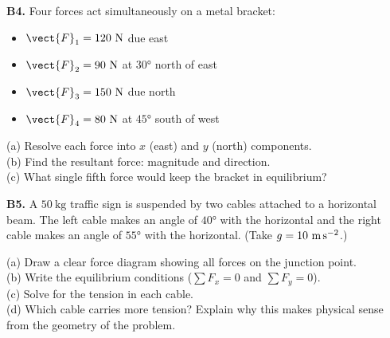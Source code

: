 \begin{exercisebox}[2]
\vspace{0.4cm}

\textbf{B4.} Four forces act simultaneously on a metal
bracket:
\begin{itemize}[noitemsep]
  \item $\vect{F}_1 = 120\ \text{N}$ due east
  \item $\vect{F}_2 = 90\ \text{N}$ at $30°$ north of east
  \item $\vect{F}_3 = 150\ \text{N}$ due north
  \item $\vect{F}_4 = 80\ \text{N}$ at $45°$ south of west
\end{itemize}
(a) Resolve each force into $x$ (east) and $y$ (north)
components.\\
(b) Find the resultant force: magnitude and direction.\\
(c) What single fifth force would keep the bracket in
equilibrium?
\hfill{}

\vspace{0.4cm}

\textbf{B5.} A $50\ \text{kg}$ traffic sign is suspended
by two cables attached to a horizontal beam. The left cable
makes an angle of $40°$ with the horizontal and the right
cable makes an angle of $55°$ with the horizontal.
(Take $g = 10\ \text{m\,s}^{-2}$.)\\[4pt]
\begin{center}
\end{center}
(a) Draw a clear force diagram showing all forces on the
junction point.\\
(b) Write the equilibrium conditions ($\sum F_x = 0$ and
$\sum F_y = 0$).\\
(c) Solve for the tension in each cable.\\
(d) Which cable carries more tension? Explain why this
makes physical sense from the geometry of the problem.
\hfill{}

\vspace{0.4cm}


\end{exercisebox}
